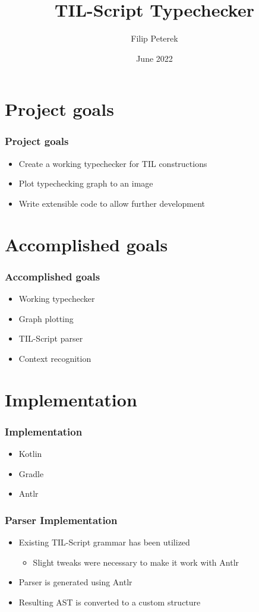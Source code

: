 \documentclass{beamer}
\title{TIL-Script Typechecker}
\author{Filip Peterek}
\institute{VSB -- Technical University of Ostrava}
\date{June 2022}
\begin{document}
\frame{\titlepage}

\section{Project goals}

\begin{frame}
    \frametitle{Project goals}
    \begin{itemize}
        \item Create a working typechecker for TIL constructions
        \item Plot typechecking graph to an image
        \item Write extensible code to allow further development
    \end{itemize}
\end{frame}

\section{Accomplished goals}

\begin{frame}
    \frametitle{Accomplished goals}
    \begin{itemize}
        \item Working typechecker
        \item Graph plotting
        \item TIL-Script parser
        \item Context recognition
    \end{itemize}
\end{frame}

\section{Implementation}

\begin{frame}
    \frametitle{Implementation}
    \begin{itemize}
        \item Kotlin
        \item Gradle
        \item Antlr
    \end{itemize}
\end{frame}

\begin{frame}
    \frametitle{Parser Implementation}
    \begin{itemize}
        \item Existing TIL-Script grammar has been utilized
            \begin{itemize}
                \item Slight tweaks were necessary to make it work with Antlr
            \end{itemize}
        \item Parser is generated using Antlr
        \item Resulting AST is converted to a custom structure
    \end{itemize}
\end{frame}
\end{document}
